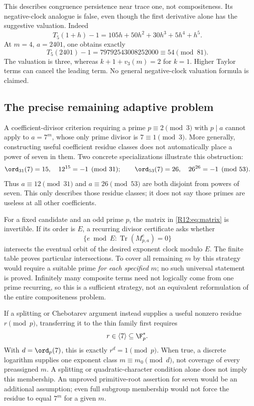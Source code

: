 \documentclass[11pt,a4paper]{article}
\theoremstyle{definition}\newtheorem{definition}[theorem]{Definition}
\theoremstyle{remark}\newtheorem{remark}[theorem]{Remark}
\DeclareMathOperator{\Tr}{Tr}\DeclareMathOperator{\tr}{tr}\DeclareMathOperator{\Nm}{N}
\begin{document}
This describes congruence persistence near trace one, not
compositeness. Its negative-clock analogue is false, even though
the first derivative alone has the suggestive valuation.
Indeed
\[
 T_5(1+h)-1=105h+50h^2+30h^3+5h^4+h^5.
\]
At $m=4$, $a=2401$, one obtains exactly
\[
 T_5(2401)-1=79792543008252000\equiv54\pmod{81}.
\]
The valuation is three, whereas $k+1+v_3(m)=2$ for $k=1$.
Higher Taylor terms can cancel the leading term. No general
negative-clock valuation formula is claimed.

\subsection{The precise remaining adaptive problem}

A coefficient-divisor criterion requiring a prime $p\equiv2\pmod3$
with $p\mid a$ cannot apply to $a=7^m$, whose only prime divisor is
$7\equiv1\pmod3$. More generally, constructing useful coefficient
residue classes does not automatically place a power of seven in them.
Two concrete specializations illustrate this obstruction:
\[
 \ord_{31}(7)=15,\quad12^{15}=-1\pmod{31};\qquad
 \ord_{53}(7)=26,\quad26^{26}=-1\pmod{53}.
\]
Thus $a\equiv12\pmod{31}$ and $a\equiv26\pmod{53}$ are both disjoint
from powers of seven. This only describes those residue classes;
it does not say those primes are useless at all other coefficients.

For a fixed candidate and an odd prime $p$, the matrix in
\eqref{R12:eq:matrix} is invertible. If its order is $E$, a recurring
divisor certificate asks whether
\[
 \{e\bmod E:\Tr(M_{p,a}^e)=0\}
\]
intersects the eventual orbit of the desired exponent clock modulo
$E$. The finite table proves particular intersections. To cover all
remaining $m$ by this strategy would require a suitable prime
\emph{for each specified $m$}; no such universal statement is proved.
Infinitely many composite terms need not logically come from one
prime recurring, so this is a sufficient strategy, not an equivalent
reformulation of the entire compositeness problem.

If a splitting or Chebotarev argument instead supplies a useful
nonzero residue $r\pmod p$, transferring it to the thin family first
requires
\[
 r\in\langle7\rangle\subseteq\F_p^*.
\]
With $d=\ord_p(7)$, this is exactly $r^d=1\pmod p$.
When true, a discrete logarithm supplies one exponent class
$m\equiv m_0\pmod d$, not coverage of every preassigned $m$.
A splitting or quadratic-character condition alone does not imply
this membership. An unproved primitive-root assertion for seven
would be an additional assumption; even full subgroup membership
would not force the residue to equal $7^m$ for a given $m$.
\end{document}
